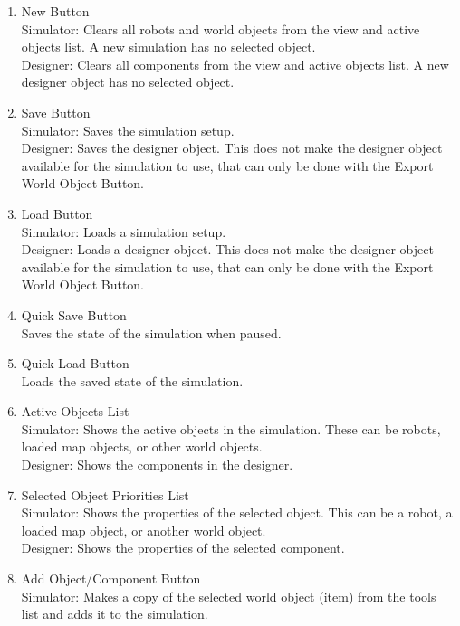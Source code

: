 \begin{enumerate}
 	\item New Button\\
 	Simulator: Clears all robots and world objects from the view and active objects list. A new simulation has no selected object.\\
 	Designer: Clears all components from the view and active objects list. A new designer object has no selected object.\\
 	\item Save Button\\
 	Simulator: Saves the simulation setup.\\
 	Designer: Saves the designer object. This does not make the designer object available for the simulation to use, that can only be done with the Export World Object Button.\\
 	\item Load Button\\
 	Simulator: Loads a simulation setup.\\
 	Designer: Loads a designer object. This does not make the designer object available for the simulation to use, that can only be done with the Export World Object Button.\\
 	\item Quick Save Button\\
 	Saves the state of the simulation when paused.\\
 	\item Quick Load Button\\
 	Loads the saved state of the simulation.\\
 	\item Active Objects List\\
 	Simulator: Shows the active objects in the simulation. These can be robots, loaded map objects, or other world objects.\\
 	Designer: Shows the components in the designer.\\
 	\item Selected Object Priorities List\\
 	Simulator: Shows the properties of the selected object. This can be a robot, a loaded map object, or another world object.\\
 	Designer: Shows the properties of the selected component.\\
 	\item Add Object/Component Button\\
 	Simulator: Makes a copy of the selected world object (item) from the tools list and adds it to the simulation.\\

\end{enumerate}
